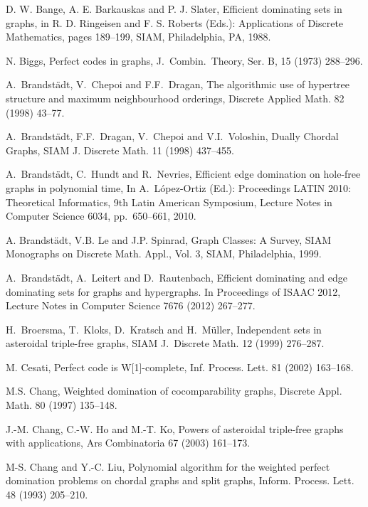 \documentclass[]{elsarticle}
\begin{document}

\begin{thebibliography}{10}
D. W. Bange, A. E. Barkauskas and P. J. Slater, Efficient dominating sets in graphs, in R.
D. Ringeisen and F. S. Roberts (Eds.): Applications of Discrete Mathematics, pages
189--199, SIAM, Philadelphia, PA, 1988.

N. Biggs, Perfect codes in graphs, J.~Combin.~Theory, Ser. B, 15 (1973) 288--296.


A.~Brandst\"adt, V.~Chepoi and F.F.~Dragan,
The algorithmic use of hypertree
structure and maximum neighbourhood orderings, Discrete Applied Math. 82
(1998) 43--77.

A.~Brandst\"adt, F.F.~Dragan, V.~Chepoi and V.I.~Voloshin,
Dually Chordal Graphs, SIAM J. Discrete Math. 11 (1998) 437--455.

A.~Brandst\"adt, C.~Hundt and R.~Nevries, Efficient edge domination on hole-free graphs in polynomial time,
In A.~L\'opez-Ortiz (Ed.): Proceedings LATIN 2010: Theoretical Informatics, 9th Latin American Symposium,
Lecture Notes in Computer Science 6034, pp.~650--661, 2010.

A. Brandst\"adt, V.B. Le and J.P. Spinrad, Graph Classes: A Survey, SIAM Monographs on Discrete Math. Appl., Vol. 3, SIAM, Philadelphia, 1999.

A.~Brandst\"adt, A.~Leitert and D.~Rautenbach, Efficient dominating and edge dominating sets
for graphs and hypergraphs. In Proceedings of ISAAC 2012, Lecture Notes in Computer Science 7676 (2012) 267--277.



 H.~Broersma, T.~Kloks, D.~Kratsch and H.~M\"uller, 
Independent sets in asteroidal triple-free
graphs, SIAM J.~Discrete Math. 12 (1999) 276--287.

M. Cesati, Perfect code is W[1]-complete,
Inf. Process. Lett. 81 (2002) 163--168.

M.S. Chang, Weighted domination of cocomparability graphs, Discrete Appl. Math. 80 (1997)
135--148.

J.-M. Chang, C.-W. Ho and M.-T. Ko,
Powers of asteroidal triple-free graphs with applications,
Ars Combinatoria 67 (2003)  161--173.

M-S. Chang and Y.-C. Liu,
Polynomial algorithm for the weighted perfect domination problems on chordal
graphs and split graphs, Inform. Process. Lett. 48 (1993) 205--210.


\end{thebibliography}
\end{document}
